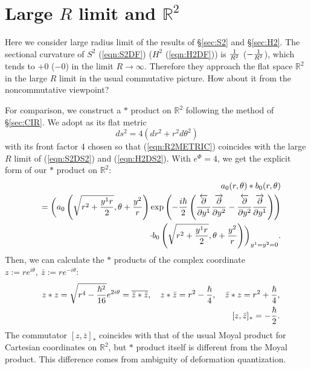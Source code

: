 \documentclass[12pt,a4paper]{article}
\def\h{\hbar}
\begin{document}
\section{Large $R$ limit and ${\mathbb R}^2$}

Here we consider large radius limit of the results of \S\ref{sec:S2}
and \S\ref{sec:H2}.
The sectional curvature of $S^2$ (\ref{eqn:S2DF})
($H^2$ (\ref{eqn:H2DF})) is ${1\over R^2}$ ($-{1\over R^2}$),
which tends to $+0$ ($-0$) in the limit $R\rightarrow\infty$.
Therefore they approach the flat space ${\mathbb R}^2$ in the large
$R$ limit in the usual commutative picture.
How about it from the noncommutative viewpoint?

For comparison, we construct a $*$ product on ${\mathbb R}^2$
following the method of \S\ref{sec:CIR}.
We adopt as its flat metric
\begin{equation}
\label{eqn:R2METRIC}
ds^2=4(dr^2+r^2d\theta^2)
\end{equation}
with its front factor 4 chosen so that (\ref{eqn:R2METRIC}) coincides with
the large $R$ limit of (\ref{eqn:S2DS2}) and (\ref{eqn:H2DS2}).
With $e^\Phi=4$, we get the explicit form of our $*$ product on
${\mathbb R}^2$:
\begin{eqnarray}
\label{eqn:AR2STR}
&&a_0(r,\theta)*b_0(r,\theta)\nonumber\\
&&=\biggl(a_0\left(\sqrt{r^2+{y^1r\over2}},\theta+{y^2\over
    r}\right)\exp\left(-{i\h\over2}\left({{\overleftarrow
        \partial}\over\partial y^1}{{\overrightarrow
        \partial}\over\partial y^2}-{{\overleftarrow
        \partial}\over\partial y^2}{{\overrightarrow
        \partial}\over\partial y^1}\right)\right)\nonumber\\
&&\cdot b_0\left(\sqrt{r^2+{y^1r\over2}},\theta+{y^2\over
    r}\right)\biggr)_{y^1=y^2=0}.
\end{eqnarray}
Then, we can calculate the  $*$ products of the complex coordinate
$z:=re^{i\theta},\ {\bar z}:=re^{-i\theta}$:
\begin{eqnarray}
\label{eqn:AR2Z}
&&z*z=\sqrt{r^4-{\h^2\over16}}e^{2i\theta}=\overline{{\bar z}*{\bar z}},\quad
z*{\bar z}=r^2-{\h\over4},\quad {\bar z}*z=r^2+{\h\over4},\nonumber\\
&&[z,{\bar z}]_*=-{\h\over2}.
\end{eqnarray}
The commutator $[z,{\bar z}]_*$ coincides
with that of the usual Moyal product for Cartesian coordinates on
${\mathbb R}^2$, but $*$ product itself is different from the Moyal
product. This difference comes from ambiguity of deformation
quantization.
\end{document}
